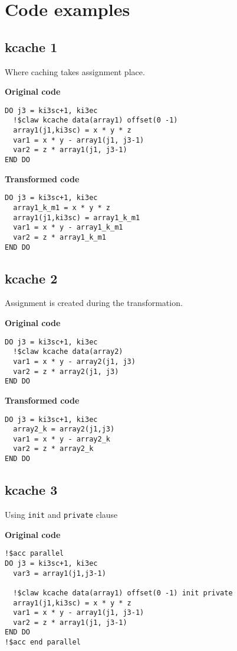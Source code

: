 
\section{Code examples}

\subsection{kcache 1}
\label{kcache1}
Where caching takes assignment place. 

\textbf{Original code}
\begin{lstlisting}
DO j3 = ki3sc+1, ki3ec
  !$claw kcache data(array1) offset(0 -1)
  array1(j1,ki3sc) = x * y * z
  var1 = x * y - array1(j1, j3-1)
  var2 = z * array1(j1, j3-1)
END DO
\end{lstlisting}


\textbf{Transformed code}
\begin{lstlisting}
DO j3 = ki3sc+1, ki3ec
  array1_k_m1 = x * y * z
  array1(j1,ki3sc) = array1_k_m1
  var1 = x * y - array1_k_m1
  var2 = z * array1_k_m1
END DO
\end{lstlisting}


\subsection{kcache 2}
\label{kcache2}
Assignment is created during the transformation. 

\textbf{Original code}
\begin{lstlisting}
DO j3 = ki3sc+1, ki3ec
  !$claw kcache data(array2)
  var1 = x * y - array2(j1, j3)
  var2 = z * array2(j1, j3)
END DO
\end{lstlisting}


\textbf{Transformed code}
\begin{lstlisting}
DO j3 = ki3sc+1, ki3ec
  array2_k = array2(j1,j3)
  var1 = x * y - array2_k
  var2 = z * array2_k
END DO
\end{lstlisting}

\subsection{kcache 3}
\label{kcache3}
Using \lstinline!init! and \lstinline!private! clause

\textbf{Original code}
\begin{lstlisting}
!$acc parallel
DO j3 = ki3sc+1, ki3ec
  var3 = array1(j1,j3-1)

  !$claw kcache data(array1) offset(0 -1) init private
  array1(j1,ki3sc) = x * y * z
  var1 = x * y - array1(j1, j3-1)
  var2 = z * array1(j1, j3-1)
END DO
!$acc end parallel
\end{lstlisting}


